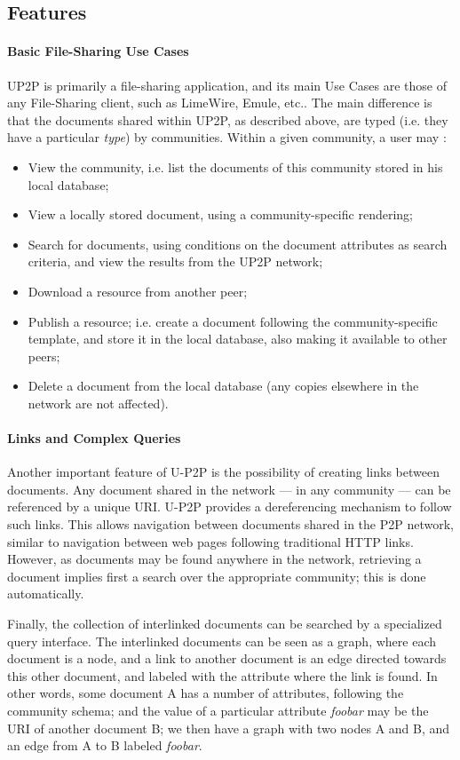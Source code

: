 \documentclass[titlepage]{article}%
\begin{document}
\subsection{Features} %
\paragraph{Basic File-Sharing Use Cases}
UP2P is primarily a file-sharing application, and its main Use Cases are those of any File-Sharing client, such as LimeWire, Emule, etc.. The main difference is that the documents shared within UP2P, as described above, are typed (i.e. they have a particular \emph{type}) by communities.
Within a given community, a user may :
\begin{itemize}
\item View the community, i.e. list the documents of this community stored in his local database; 
\item View a locally stored document, using a community-specific rendering;
\item Search for documents, using conditions on the document attributes as search criteria, and view the results from the UP2P network; 
\item Download a resource from another peer; 
\item Publish a resource; i.e. create a document following the community-specific template, and store it in the local database, also making it available to other peers;
\item Delete a document from the local database (any copies elsewhere in the network are not affected).
\end{itemize}

\paragraph{Links and Complex Queries}
Another important feature of U-P2P is the possibility of creating links between documents. Any document shared in the network --- in any community --- can be referenced by a unique URI. U-P2P provides a dereferencing mechanism to follow such links. This allows navigation between documents shared in the P2P network, similar to navigation between web pages following traditional HTTP links. However, as documents may be found anywhere in the network, retrieving a document implies first a search over the appropriate community; this is done automatically.

Finally, the collection of interlinked documents can be searched by a specialized query interface. The interlinked documents can be seen as a graph, where each document is a node, and a link to another document is an edge directed towards this other document, and labeled with the attribute where the link is found. In other words, some document A has a number of attributes, following the community schema; and the value of a particular attribute \emph{foobar} may be the URI of another document B; we then have a graph with two nodes A and B, and an edge from A to B labeled \emph{foobar}.
\end{document}
